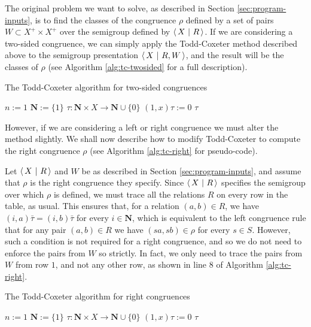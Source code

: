 The original problem we want to solve, as described in Section
\ref{sec:program-inputs}, is to find the classes of the congruence $\rho$
defined by a set of pairs $W \subset X^+ \times X^+$ over the semigroup defined
by $\left\langle\,X ~\middle|~ R\,\right\rangle$.  If we are considering
a two-sided congruence, we can simply apply the Todd-Coxeter method described
above to the semigroup presentation $\left\langle\,X ~\middle|~ R,W\,\right\rangle$, and the result will be the
classes of $\rho$ (see Algorithm \ref{alg:tc-twosided} for a full description).

\begin{algorithm}
\caption{The Todd-Coxeter algorithm for two-sided congruences}
\label{alg:tc-twosided}
\begin{algorithmic}[1]
\State $n := 1$
\State $\mathbf{N} := \{1\}$
\State $\tau : \mathbf{N} \times X \to \mathbf{N} \cup \{0\}$
  \State $(1, x)\tau := 0$
\EndFor
{}
    \State {}
  \EndFor
    \State {}
  \EndFor
\EndFor
\State \Return $\tau$
\EndProcedure
\end{algorithmic}
\end{algorithm}

However, if we are considering a left or right congruence we
must alter the method slightly.  We shall now describe how to modify
Todd-Coxeter to compute the right congruence $\rho$ (see Algorithm
\ref{alg:tc-right} for pseudo-code).

Let $\left\langle\,X ~\middle|~ R\,\right\rangle$ and $W$ be as described in Section \ref{sec:program-inputs}, and
assume that $\rho$ is the right congruence they specify.  Since
$\left\langle\,X ~\middle|~ R\,\right\rangle$ specifies the semigroup over which $\rho$ is defined, we must trace
all the relations $R$ on every row in the table, as usual.  This ensures that,
for a relation $(a,b) \in R$, we have $(i, a)\bar\tau = (i, b)\bar\tau$ for
every $i \in \mathbf{N}$, which is equivalent to the left congruence rule that
for any pair $(a,b) \in R$ we have $(sa, sb) \in \rho$ for every $s \in S$.
However, such a condition is not required for a right congruence, and so we do
not need to enforce the pairs from $W$ so strictly.  In fact, we only need to
trace the pairs from $W$ from row $1$, and not any other row, as shown in line 8
of Algorithm \ref{alg:tc-right}.

\begin{algorithm}
\caption{The Todd-Coxeter algorithm for right congruences}
\label{alg:tc-right}
\begin{algorithmic}[1]
\State $n := 1$
\State $\mathbf{N} := \{1\}$
\State $\tau : \mathbf{N} \times X \to \mathbf{N} \cup \{0\}$
  \State $(1, x)\tau := 0$
\EndFor
{}
  \State {}
\EndFor
{}
    \State {}
  \EndFor
\EndFor
\State \Return $\tau$
\EndProcedure
\end{algorithmic}
\end{algorithm}

